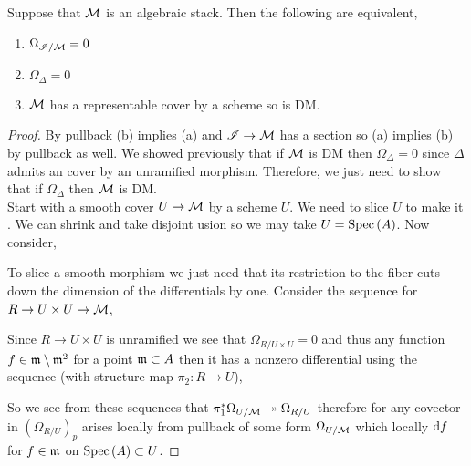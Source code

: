 \documentclass[12pt]{article}
\begin{document}
\begin{prop}
Suppose that $\mathcal{M}$ is an algebraic stack. Then the following are equivalent,
\begin{enumerate}
\item $\Omega_{\mathscr{I} / \mathcal{M}} = 0$
\item $\Omega_{\Delta} = 0$
\item $\mathcal{M}$ has a representable \etale cover by a scheme so is DM.
\end{enumerate}
\end{prop}

\begin{proof}
By pullback (b) implies (a) and $\mathscr{I} \to \mathcal{M}$ has a section so (a) implies (b) by pullback as well. We showed previously that if $\mathcal{M}$ is DM then $\Omega_{\Delta} = 0$ since $\Delta$ admits an \etale cover by an unramified morphism. Therefore, we just need to show that if $\Omega_{\Delta}$ then $\mathcal{M}$ is DM. 
\bigskip\\
Start with a smooth cover $U \to \mathcal{M}$ by a scheme $U$. We need to slice $U$ to make it \etale. We can shrink and take disjoint usion so we may take $U = \mathrm{Spec}\left( A \right)$. Now consider,
\begin{center}
\end{center}
To slice a smooth morphism we just need that its restriction to the fiber cuts down the dimension of the differentials by one. Consider the sequence for $R \to U \times U \to \mathcal{M}$,
\begin{center}
\end{center}
Since $R \to U \times U$ is unramified we see that $\Omega_{R / U \times U} = 0$ and thus any function $f \in \mathfrak{m} \setminus \mathfrak{m}^2$ for a point $\mathfrak{m} \subset A$ then it has a nonzero differential using the sequence (with structure map $\pi_2 : R \to U$),
\begin{center}
\end{center}
So we see from these sequences that $\pi_1^* \Omega_{U / \mathcal{M}} \twoheadrightarrow \Omega_{R/U}$ therefore for any covector in $(\Omega_{R/U})_p$ arises locally from pullback of some form $\Omega_{U/\mathcal{M}}$ which locally $\mathrm{d}{f}$ for $f \in \mathfrak{m}$ on $\mathrm{Spec}\left( A \right) \subset U$. 
\end{proof}
\end{document}

